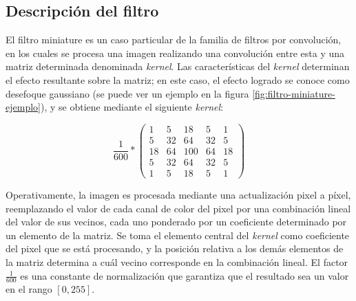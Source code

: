 \subsection{Descripción del filtro}
\label{sub:miniature_descripcion}

El filtro miniature es un caso particular de la familia de filtros por convolución, en los cuales se procesa una imagen realizando una convolución entre esta y una matriz determinada denominada \emph{kernel}. Las características del \emph{kernel} determinan el efecto resultante sobre la matriz; en este caso, el efecto logrado se conoce como desefoque gaussiano (se puede ver un ejemplo en la figura \ref{fig:filtro-miniature-ejemplo}), y se obtiene mediante el siguiente \emph{kernel}:

\[ \frac{1}{600} *  \left( \begin{array}{ccccc}
  1 &   5 &  18 &   5 &   1 \\
  5 &  32 &  64 &  32 &   5 \\
 18 &  64 & 100 &  64 &  18 \\
  5 &  32 &  64 &  32 &   5 \\
  1 &   5 &  18 &   5 &   1 \end{array} \right)\]

Operativamente, la imagen es procesada mediante una actualización pixel a píxel, reemplazando el valor de cada canal de color del pixel por una combinación lineal del valor de sus vecinos, cada uno ponderado por un coeficiente determinado por un elemento de la matriz. Se toma el elemento central del \emph{kernel} como coeficiente del pixel que se está procesando, y la posición relativa a los demás elementos de la matriz determina a cuál vecino corresponde en la combinación lineal. El factor $\frac{1}{600}$ es una constante de normalización que garantiza que el resultado sea un valor en el rango $[0, 255]$.

